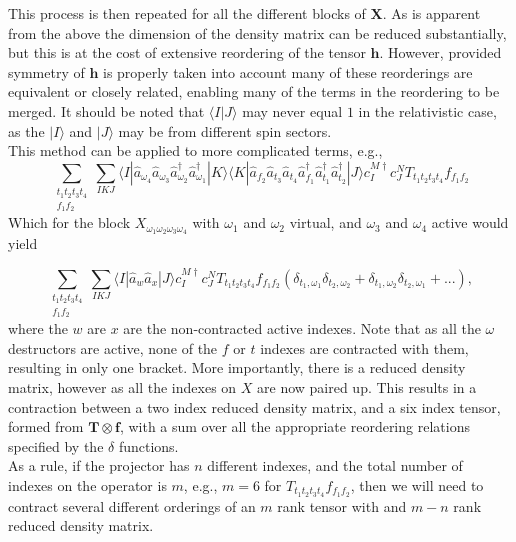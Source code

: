 \documentclass[12pt]{article}
\begin{document}
This process is then repeated for all the different blocks  of $\mathbf{X}$. As is apparent from the above the dimension of the 
density matrix can be reduced substantially, but this is at the cost of extensive reordering of the tensor $\mathbf{h}$. However, 
provided symmetry of $\mathbf{h}$ is properly taken into account many of these reorderings are equivalent or closely related,
enabling many of the terms in the reordering to be merged. It should be noted that $\langle I | J \rangle $ may never equal $1$ 
in the relativistic case, as the $ | I\rangle $ and $| J \rangle $ may be from different spin sectors.\\ 

\noindent This method can be applied to more complicated terms, e.g.,
\begin{equation}
\sum_{ \substack{t_{1}t_{2}t_{3}t_{4}\\ f_{1}f_{2}}} 
\sum_{IKJ}
\langle I |
\hat{a}_{\omega_{4}} \hat{a}_{\omega_{3}}\hat{a}^{\dagger}_{\omega_{2}}\hat{a}^{\dagger}_{\omega_{1}}
| K \rangle \langle K | 
\hat{a}_{f_{2}}\hat{a}_{t_{3}}\hat{a}_{t_{4}}\hat{a}^{\dagger}_{f_{1}}\hat{a}^{\dagger}_{t_{1}} \hat{a}^{\dagger}_{t_{2}}| J \rangle  
c^{M \dagger}_{I}c^{N}_{J} T_{t_{1}t_{2}t_{3}t_{4}}f_{f_{1}f_{2}}
\label{eqn:X_RI_fT_anti_normal1}
\end{equation}
Which for the block $X_{\omega_{1}\omega_{2}\omega_{3}\omega_{4}}$ with 
$\omega_{1}$ and $\omega_{2}$ virtual, and $\omega_{3}$ and $\omega_{4}$ active would yield 

\begin{equation}
\sum_{ \substack{t_{1}t_{2}t_{3}t_{4}\\ f_{1}f_{2}}} 
\sum_{IKJ}
\langle I | \hat{a}_{w}\hat{a}_{x}| J \rangle  
c^{M \dagger}_{I}c^{N}_{J} T_{t_{1}t_{2}t_{3}t_{4}}f_{f_{1}f_{2}}
( \delta_{t_{1},\omega_{1}}\delta_{t_{2},\omega_{2}} +  \delta_{t_{1},\omega_{2}}\delta_{t_{2},\omega_{1}} + ... ),
\label{eqn:XfTend}
\end{equation}
\noindent where the $w$ are $x$  are the non-contracted active indexes.
Note that as all the $\omega$ destructors are active, none of the $f$ or $t$ indexes are contracted with them,
resulting in only one bracket. More importantly, there is a reduced density matrix, however as all the indexes on
$X$ are now paired up. This results in a contraction between a two index reduced density matrix, and a six index
tensor, formed from $\mathbf{T}\otimes\mathbf{f}$, with a sum over all the appropriate reordering relations 
specified by the $\delta$ functions. \\ 

\noindent As a rule, if the projector has $n$ different indexes, and the total number of indexes on the operator is $m$, e.g.,
$m=6$ for $T_{t_{1}t_{2}t_{3}t_{4}}f_{f_{1}f_{2}}$, then we will need to contract several different orderings of an $m$ rank
tensor with and $m-n$ rank reduced density matrix. 
\end{document}
